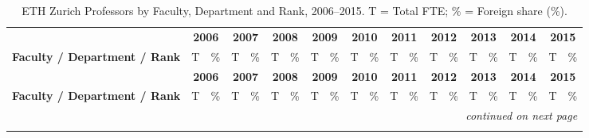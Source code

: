 \documentclass{article}
\begin{document}
\small
\setlength{\tabcolsep}{3pt}
\renewcommand{\arraystretch}{1.05}

\begin{longtable}{@{}l rr rr rr rr rr rr rr rr rr rr@{}}
  \caption{ETH Zurich Professors by Faculty, Department and Rank, 2006--2015. T = Total FTE; \% = Foreign share (\%).} \label{tab:eth_professors_part1} \\
  \toprule
   & \multicolumn{2}{c}{\textbf{2006}} & \multicolumn{2}{c}{\textbf{2007}} & \multicolumn{2}{c}{\textbf{2008}} & \multicolumn{2}{c}{\textbf{2009}} & \multicolumn{2}{c}{\textbf{2010}} & \multicolumn{2}{c}{\textbf{2011}} & \multicolumn{2}{c}{\textbf{2012}} & \multicolumn{2}{c}{\textbf{2013}} & \multicolumn{2}{c}{\textbf{2014}} & \multicolumn{2}{c}{\textbf{2015}} \\
  \cmidrule(lr){2-3} \cmidrule(lr){4-5} \cmidrule(lr){6-7} \cmidrule(lr){8-9} \cmidrule(lr){10-11} \cmidrule(lr){12-13} \cmidrule(lr){14-15} \cmidrule(lr){16-17} \cmidrule(lr){18-19} \cmidrule(lr){20-21}
  \textbf{Faculty / Department / Rank}  & T & \% & T & \% & T & \% & T & \% & T & \% & T & \% & T & \% & T & \% & T & \% & T & \% \\
  \midrule
  \endfirsthead

  \toprule
   & \multicolumn{2}{c}{\textbf{2006}} & \multicolumn{2}{c}{\textbf{2007}} & \multicolumn{2}{c}{\textbf{2008}} & \multicolumn{2}{c}{\textbf{2009}} & \multicolumn{2}{c}{\textbf{2010}} & \multicolumn{2}{c}{\textbf{2011}} & \multicolumn{2}{c}{\textbf{2012}} & \multicolumn{2}{c}{\textbf{2013}} & \multicolumn{2}{c}{\textbf{2014}} & \multicolumn{2}{c}{\textbf{2015}} \\
  \cmidrule(lr){2-3} \cmidrule(lr){4-5} \cmidrule(lr){6-7} \cmidrule(lr){8-9} \cmidrule(lr){10-11} \cmidrule(lr){12-13} \cmidrule(lr){14-15} \cmidrule(lr){16-17} \cmidrule(lr){18-19} \cmidrule(lr){20-21}
  \textbf{Faculty / Department / Rank}  & T & \% & T & \% & T & \% & T & \% & T & \% & T & \% & T & \% & T & \% & T & \% & T & \% \\
  \midrule
  \endhead

  \midrule
  \multicolumn{21}{r}{\textit{continued on next page}} \\
  \endfoot

  \bottomrule
  \endlastfoot


\end{longtable}
\end{document}
